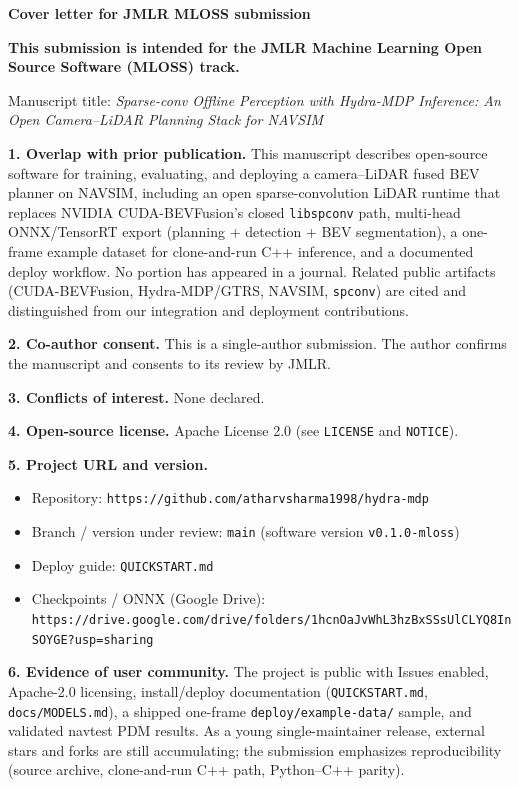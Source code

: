\documentclass[11pt]{article}
\begin{document}
\noindent\textbf{Cover letter for JMLR MLOSS submission}

\medskip
\noindent\textbf{This submission is intended for the JMLR Machine Learning Open Source Software (MLOSS) track.}

\medskip
\noindent Manuscript title: \textit{Sparse-conv Offline Perception with Hydra-MDP Inference: An Open Camera--LiDAR Planning Stack for NAVSIM}

\medskip
\noindent\textbf{1. Overlap with prior publication.} This manuscript describes open-source software for training, evaluating, and deploying a camera--LiDAR fused BEV planner on NAVSIM, including an open sparse-convolution LiDAR runtime that replaces NVIDIA CUDA-BEVFusion's closed \texttt{libspconv} path, multi-head ONNX/TensorRT export (planning + detection + BEV segmentation), a one-frame example dataset for clone-and-run C++ inference, and a documented deploy workflow. No portion has appeared in a journal. Related public artifacts (CUDA-BEVFusion, Hydra-MDP/GTRS, NAVSIM, \texttt{spconv}) are cited and distinguished from our integration and deployment contributions.

\medskip
\noindent\textbf{2. Co-author consent.} This is a single-author submission. The author confirms the manuscript and consents to its review by JMLR.

\medskip
\noindent\textbf{3. Conflicts of interest.} None declared.

\medskip
\noindent\textbf{4. Open-source license.} Apache License 2.0 (see \texttt{LICENSE} and \texttt{NOTICE}).

\medskip
\noindent\textbf{5. Project URL and version.}
\begin{itemize}
  \item Repository: \texttt{https://github.com/atharvsharma1998/hydra-mdp}
  \item Branch / version under review: \texttt{main} (software version \texttt{v0.1.0-mloss})
  \item Deploy guide: \texttt{QUICKSTART.md}
  \item Checkpoints / ONNX (Google Drive): \texttt{https://drive.google.com/drive/folders/1hcnOaJvWhL3hzBxSSsUlCLYQ8InSOYGE?usp=sharing}
\end{itemize}

\medskip
\noindent\textbf{6. Evidence of user community.} The project is public with Issues enabled, Apache-2.0 licensing, install/deploy documentation (\texttt{QUICKSTART.md}, \texttt{docs/MODELS.md}), a shipped one-frame \texttt{deploy/example-data/} sample, and validated navtest PDM results. As a young single-maintainer release, external stars and forks are still accumulating; the submission emphasizes reproducibility (source archive, clone-and-run C++ path, Python--C++ parity).
\end{document}
